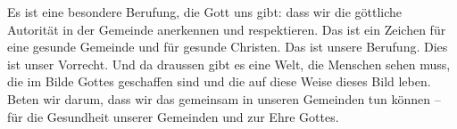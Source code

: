 \documentclass{../../inc/mybib}
\begin{document}
Es ist eine besondere Berufung, die Gott uns gibt: dass wir die göttliche Autorität in der Gemeinde anerkennen und respektieren. Das ist ein Zeichen für eine gesunde Gemeinde und für gesunde Christen. Das ist unsere Berufung. Dies ist unser Vorrecht. Und da draussen gibt es eine Welt, die Menschen sehen muss, die im Bilde Gottes geschaffen sind und die auf diese Weise dieses Bild leben. Beten wir darum, dass wir das gemeinsam in unseren Gemeinden tun können -- für die Gesundheit unserer Gemeinden und zur Ehre Gottes.
\end{document}
